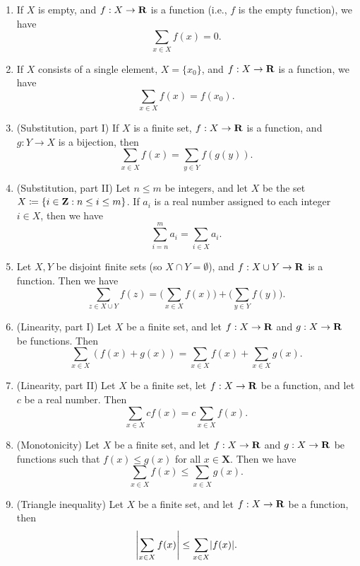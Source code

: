\begin{proposition}\label{7.1.11}
  \mbox{}
  \begin{enumerate}
    \item If \(X\) is empty, and \(f : X \to \mathbf{R}\) is a function (i.e., \(f\) is the empty function), we have
          \[
            \sum_{x \in X} f(x) = 0.
          \]
    \item If \(X\) consists of a single element, \(X = \{x_0\}\), and \(f : X \to \mathbf{R}\) is a function, we have
          \[
            \sum_{x \in X} f(x) = f(x_0).
          \]
    \item (Substitution, part I) If \(X\) is a finite set, \(f : X \to \mathbf{R}\) is a function, and \(g : Y \to X\) is a bijection, then
          \[
            \sum_{x \in X} f(x) = \sum_{y \in Y} f(g(y)).
          \]
    \item (Substitution, part II) Let \(n \leq m\) be integers, and let \(X\) be the set \(X \coloneqq \{i \in \mathbf{Z} : n \leq i \leq m\}\).
          If \(a_i\) is a real number assigned to each integer \(i \in X\), then we have
          \[
            \sum_{i = n}^m a_i = \sum_{i \in X} a_i.
          \]
    \item Let \(X, Y\) be disjoint finite sets (so \(X \cap Y = \emptyset\)), and \(f : X \cup Y \to \mathbf{R}\) is a function.
          Then we have
          \[
            \sum_{z \in X \cup Y} f(z) = \Bigg(\sum_{x \in X} f(x)\Bigg) + \Bigg(\sum_{y \in Y} f(y)\Bigg).
          \]
    \item (Linearity, part I) Let \(X\) be a finite set, and let \(f : X \to \mathbf{R}\) and \(g : X \to \mathbf{R}\) be functions.
          Then
          \[
            \sum_{x \in X} (f(x) + g(x)) = \sum_{x \in X} f(x) + \sum_{x \in X} g(x).
          \]
    \item (Linearity, part II) Let \(X\) be a finite set, let \(f : X \to \mathbf{R}\) be a function, and let \(c\) be a real number.
          Then
          \[
            \sum_{x \in X} cf(x) = c \sum_{x \in X} f(x).
          \]
    \item (Monotonicity) Let \(X\) be a finite set, and let \(f : X \to \mathbf{R}\) and \(g : X \to \mathbf{R}\) be functions such that \(f(x) \leq g(x)\) for all \(x \in \mathbf{X}\).
          Then we have
          \[
            \sum_{x \in X} f(x) \leq \sum_{x \in X} g(x).
          \]
    \item (Triangle inequality) Let \(X\) be a finite set, and let \(f : X \to \mathbf{R}\) be a function, then
          \[
            \abs{\sum_{x \in X} f(x)} \leq \sum_{x \in X} \abs{f(x)}.
          \]
  \end{enumerate}
\end{proposition}

